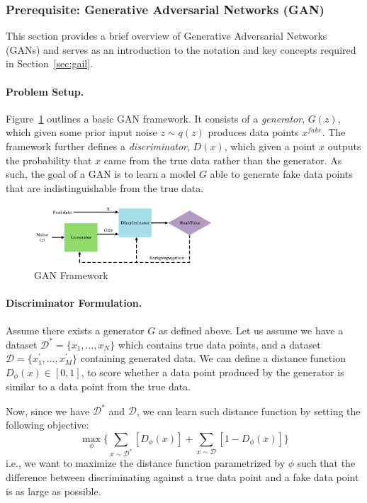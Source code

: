 \documentclass[11pt]{article}
\begin{document}
\subsubsection{ Prerequisite: Generative Adversarial Networks (GAN)}
\label{sec:gan}
This section provides a brief overview of Generative Adversarial Networks (GANs) \cite{goodfellow2014gan} and serves as an introduction to the notation and key concepts required in Section~\ref{sec:gail}. 

\paragraph{Problem Setup.}

Figure~\ref{fig:gan_framework} outlines a basic GAN framework. It consists of a \textit{generator}, $G(z)$, which given some prior input noise $z \sim q(z)$ produces data points $x^{fake}$. The framework further defines a \textit{discriminator}, $D(x)$, which given a point $x$ outputs the probability that $x$ came from the true data rather than the generator. As such, the goal of a GAN is to learn a model $G$ able to generate fake data points that are indistinguishable from the true data. 

\begin{figure}[H]
    \centering
    \includegraphics[width=0.6\textwidth]{images/gan_framework.png}
    \caption{GAN Framework}
    \label{fig:gan_framework}
\end{figure}

\paragraph{Discriminator Formulation.}

Assume there exists a generator $G$ as defined above. Let us assume we have a dataset $\mathcal{D}^\ast = \{x_1, ..., x_N\}$ which contains true data points, and a dataset $\mathcal{D} = \{x_1^{'}, ..., x_M^{'}\}$ containing generated data. We can define a distance function $D_{\phi}(x) \in [0, 1]$, to score whether a data point produced by the generator is similar to a data point from the true data. 

Now, since we have $\mathcal{D}^\ast$ and $\mathcal{D}$, we can learn such distance function by setting the following objective:
\begin{equation}
    \label{eq:gan_d}
    \max_{\phi} \Big\{ 
    \sum\limits_{x\sim\mathcal{D}^\ast} [D_{\phi}(x)] +
    \sum\limits_{x\sim\mathcal{D}} [1 - D_{\phi}(x)] \Big\}
\end{equation}
i.e., we want to maximize the distance function parametrized by $\phi$ such that the difference between discriminating against a true data point and a fake data point is as large as possible.
\end{document}
